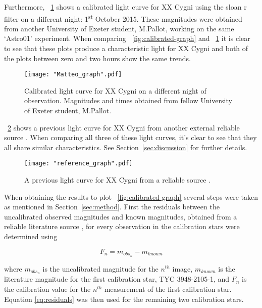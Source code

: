 \documentclass{article}
\newcommand{\figref}[2][\figurename~]{#1\ref{#2}}
\newcommand{\secref}[2][Section~]{#1\ref{#2}}
\begin{document}
\newpage

\vspace{2mm}
\noindent
Furthermore, \figref{fig:matteo-graph} shows a calibrated light curve for XX Cygni using the sloan r filter on a different night: 1\textsuperscript{st} October 2015. These magnitudes were obtained from another University of Exeter student, M.Pallot, working on the same `Astro01' experiment. When comparing \figref{fig:calibrated-graph} and \figref{fig:matteo-graph} it is clear to see that these plots produce a characteristic light for XX Cygni and both of the plots between zero and two hours show the same trends.

\begin{figure}[h]
\centering
\texttt{[image: "Matteo\_graph".pdf]}
\caption{Calibrated light curve for XX Cygni on a different night of observation. Magnitudes and times obtained from fellow University of Exeter student, M.Pallot.}
\label{fig:matteo-graph}
\end{figure}

\newpage
\vspace{2mm}
\noindent
\figref{fig:reference-graph} shows a previous light curve for XX Cygni from another external reliable source \cite{Web04}. When comparing all three of these light curves, it's clear to see that they all share similar characteristics. See \secref{sec:discussion} for further details.

\vspace{15mm}
\begin{figure}[h]
\centering
\texttt{[image: "reference\_graph".pdf]}
\caption{A previous light curve for XX Cygni from a reliable source \cite{Web04}.}
\label{fig:reference-graph}
\end{figure}

\vspace{2mm}
\noindent
When obtaining the results to plot \figref{fig:calibrated-graph} several steps were taken as mentioned in \secref{sec:method}. First the residuals between the uncalibrated observed magnitudes and known magnitudes, obtained from a reliable literature source \cite{Web03}, for every observation in the calibration stars were determined using 

\begin{equation}
\label{eq:residuals}
F_n = m_{obs_n} - m_{known} 
\end{equation}

\vspace{2mm}
\noindent
where $m_{obs_n}$ is the uncalibrated magnitude for the $n^{th}$ image, $m_{known}$ is the literature magnitude \cite{Web03} for the first calibration star, TYC 3948-2105-1, and $F_n$ is the calibration value for the $n^{th}$ measurement of the first calibration star. Equation \eqref{eq:residuals} was then used for the remaining two calibration stars.
\end{document}
